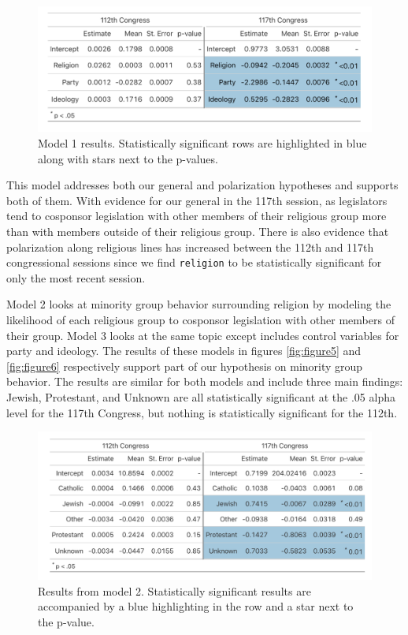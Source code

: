 \documentclass[Royal,times,sageh]{sagej}
\begin{document}
\begin{figure}

{\centering \includegraphics[width=0.85\linewidth]{images/final_model1} 

}

\caption{Model 1 results. Statistically significant rows are highlighted in blue along with stars next to the p-values. \label{fig:figure4}}\label{fig:unnamed-chunk-4}
\end{figure}

This model addresses both our general and polarization hypotheses and
supports both of them. With evidence for our general in the 117th
session, as legislators tend to cosponsor legislation with other members
of their religious group more than with members outside of their
religious group. There is also evidence that polarization along
religious lines has increased between the 112th and 117th congressional
sessions since we find \texttt{religion} to be statistically significant
for only the most recent session.

Model 2 looks at minority group behavior surrounding religion by
modeling the likelihood of each religious group to cosponsor legislation
with other members of their group. Model 3 looks at the same topic
except includes control variables for party and ideology. The results of
these models in figures \ref{fig:figure5} and \ref{fig:figure6}
respectively support part of our hypothesis on minority group behavior.
The results are similar for both models and include three main findings:
Jewish, Protestant, and Unknown are all statistically significant at the
.05 alpha level for the 117th Congress, but nothing is statistically
significant for the 112th.

\begin{figure}

{\centering \includegraphics[width=0.85\linewidth]{images/final_model2} 

}

\caption{Results from model 2. Statistically significant results are accompanied by a blue highlighting in the row and a star next to the p-value. \label{fig:figure5}}\label{fig:unnamed-chunk-5}
\end{figure}
\end{document}
